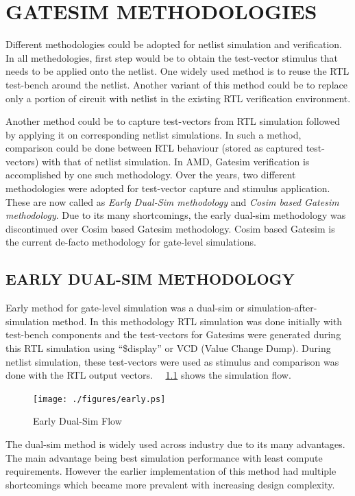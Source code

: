 \chapter{GATESIM METHODOLOGIES}
\label{chap:methodologies.tex}

Different methodologies could be adopted for netlist simulation and verification. In all methedologies, first step would be to obtain the test-vector stimulus that needs to be applied onto the netlist. One widely used method is to reuse the RTL test-bench around the netlist. Another variant of this method could be to replace only a portion of circuit with netlist in the existing RTL verification environment.

Another method could be to capture test-vectors from RTL simulation followed by applying it on corresponding netlist simulations. In such a method, comparison could be done between RTL behaviour (stored as captured test-vectors) with that of netlist simulation.  In AMD, Gatesim verification is accomplished by one such methodology. Over the years, two different methodologies were adopted for test-vector capture and stimulus application. These are now called as {\it Early Dual-Sim methodology} and {\it Cosim based Gatesim methodology}. Due to its many shortcomings, the early dual-sim methodology was discontinued over Cosim based Gatesim methodology. Cosim based Gatesim is the current de-facto methodology for gate-level simulations.


\section{EARLY DUAL-SIM METHODOLOGY}
Early method for gate-level simulation was a dual-sim or simulation-after-simulation method. In this methodology RTL simulation was done initially with test-bench components and the test-vectors for Gatesims were generated during this RTL simulation using ``\$display'' or VCD (Value Change Dump). During netlist simulation, these test-vectors were used as stimulus and comparison was done with the RTL output vectors. ~\figurename{~\ref{fig:early.ps}} shows the simulation flow. %

\begin{figure}[h]
\centering
\texttt{[image: ./figures/early.ps]}
\caption{Early Dual-Sim Flow}
\label{fig:early.ps}
\end{figure}

The dual-sim method is widely used across industry due to its many advantages. The main advantage being best simulation performance with least compute requirements. However the earlier implementation of this method had multiple shortcomings which became more prevalent with increasing design complexity.
